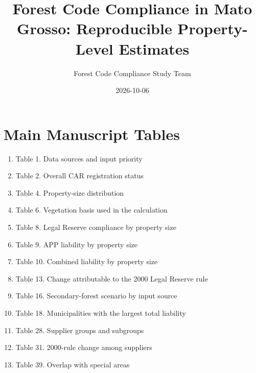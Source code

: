 \documentclass[12pt]{article}
\title{Forest Code Compliance in Mato Grosso: Reproducible Property-Level Estimates}
\author{Forest Code Compliance Study Team}
\date{2026-10-06}
\begin{document}
\maketitle
\clearpage
\section*{Main Manuscript Tables}
\begin{enumerate}
\item Table 1. Data sources and input priority
\item Table 2. Overall CAR registration status
\item Table 4. Property-size distribution
\item Table 6. Vegetation basis used in the calculation
\item Table 8. Legal Reserve compliance by property size
\item Table 9. APP liability by property size
\item Table 10. Combined liability by property size
\item Table 13. Change attributable to the 2000 Legal Reserve rule
\item Table 16. Secondary-forest scenario by input source
\item Table 18. Municipalities with the largest total liability
\item Table 28. Supplier groups and subgroups
\item Table 31. 2000-rule change among suppliers
\item Table 39. Overlap with special areas
\end{enumerate}
\clearpage
\end{document}
